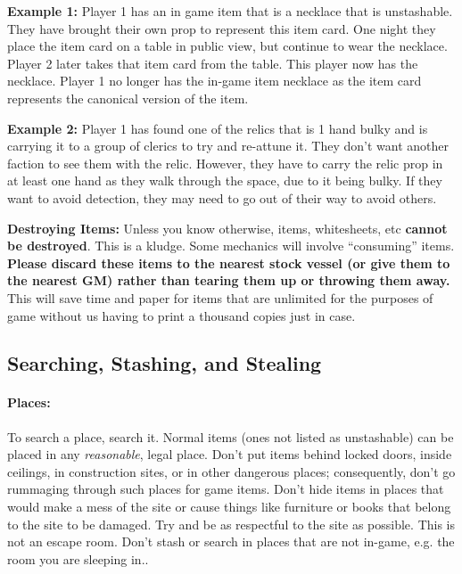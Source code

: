 \documentclass[sheet]{GL2020}
\begin{document}
\textbf{Example 1:}\newline
Player 1 has an in game item that is a necklace that is unstashable. They have brought their own prop to represent this item card. One night they place the item card on a table in public view, but continue to wear the necklace. Player 2 later takes that item card from the table. This player now has the necklace. Player 1 no longer has the in-game item necklace as the item card represents the canonical version of the item.

\textbf{Example 2:}\newline
Player 1 has found one of the relics that is 1 hand bulky and is carrying it to a group of clerics to try and re-attune it. They don’t want another faction to see them with the relic. However, they have to carry the relic prop in at least one hand as they walk through the space, due to it being bulky. If they want to avoid detection, they may need to go out of their way to avoid others.

\textbf{Destroying Items:} Unless you know otherwise, items, whitesheets, etc \textbf{cannot be destroyed}. This is a kludge. Some mechanics will involve ``consuming'' items. \textbf{Please discard these items to the nearest stock vessel (or give them to the nearest GM) rather than tearing them up or throwing them away.} This will save time and paper for items that are unlimited for the purposes of game without us having to print a thousand copies just in case.

\subsection{Searching, Stashing, and Stealing}

\paragraph{Places:} To search a place, search it. Normal items (ones not listed as unstashable) can be placed in any \emph{reasonable}, legal place. Don't put items behind locked doors, inside ceilings, in construction sites, or in other dangerous places; consequently, don't go rummaging through such places for game items. Don’t hide items in places that would make a mess of the site or cause things like furniture or books that belong to the site to be damaged. Try and be as respectful to the site as possible. This is not an escape room. Don't stash or search in places that are not in-game, e.g. the room you are sleeping in..
\end{document}
